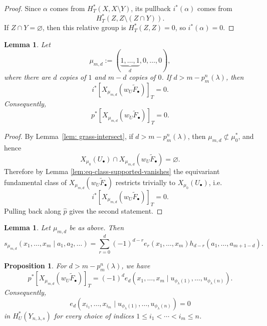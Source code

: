 \documentclass[11pt]{amsart}
\numberwithin{equation}{section}
\newtheorem{proposition}[theorem]{Proposition}
\newtheorem{lemma}[theorem]{Lemma}
\theoremstyle{definition}
\begin{document}
\begin{proof}
    Since $\alpha$ comes from $H_T^*(X,X\setminus Y)$, its pullback
    $i^*(\alpha)$ comes from
    \[
        H_T^*(Z,Z\setminus (Z\cap Y)).
    \]
    If $Z\cap Y=\varnothing$, then this relative group is
    $H_T^*(Z,Z)=0$, so $i^*(\alpha)=0$.
\end{proof}

\begin{lemma}\label{lem: musd-vanishing}
    Let
    \[
    \mu_{m,d}:=(\underbrace{1,\dots,1}_{d},0,\dots,0),
    \]
    where there are $d$ copies of $1$ and $m-d$ copies of $0$. If
    $d>m-p_m^n(\lambda)$, then
    \[
    i^*[X_{\mu_{m,d}}(w_U\widetilde{F}_\bullet)]_T=0.
    \]
    Consequently,
    \[
    p^*[X_{\mu_{m,d}}(w_U\widetilde{F}_\bullet)]_T=0.
    \]
\end{lemma}

\begin{proof}
    By Lemma~\ref{lem: grass-intersect}, if $d>m-p_m^n(\lambda)$, then
    $\mu_{m,d}\not\subset \mu_0^*$, and hence
    \[
    X_{\mu_0}(U_\bullet)\cap X_{\mu_{m,d}}(w_U\widetilde{F}_\bullet)=\varnothing.
    \]
    Therefore by Lemma \ref{lem:eq-class-supported-vanishes} the equivariant fundamental class of
    $X_{\mu_{m,d}}(w_U\widetilde{F}_\bullet)$ restricts trivially to
    $X_{\mu_0}(U_\bullet)$, i.e.
    \[
    i^*[X_{\mu_{m,d}}(w_U\widetilde{F}_\bullet)]_T=0.
    \]
    Pulling back along $\widehat{p}$ gives the second statement.
\end{proof}

\begin{lemma}\label{lem: eq-class-musd}\cite{AH}
    Let $\mu_{m,d}$ be as above. Then
    \begin{equation}\label{eq: schur-musd}
        s_{\mu_{m,d}}(x_1,\dots,x_m\mid a_1,a_2,\dots)
        =\sum_{r=0}^{d} (-1)^{d-r}
        e_r(x_1,\dots,x_m)h_{d-r}(a_1,\dots,a_{m+1-d}).
    \end{equation}
\end{lemma}

\begin{proposition}\label{prop: family2}
    For $d>m-p_m^n(\lambda)$, we have
    \[
    p^*[X_{\mu_{m,d}}(w_U\widetilde{F}_\bullet)]_T
    =(-1)^d e_d(x_1,\dots,x_m\mid u_{\phi_\lambda(1)},\dots,u_{\phi_\lambda(n)}).
    \]
    Consequently,
    \[
    e_d(x_{i_1},\dots,x_{i_m}\mid u_{\phi_\lambda(1)},\dots,u_{\phi_\lambda(n)})=0
    \]
    in $H_U^*(Y_{n,\lambda,s})$ for every choice of indices
    $1\leq i_1<\cdots<i_m\leq n$.
\end{proposition}
\end{document}
